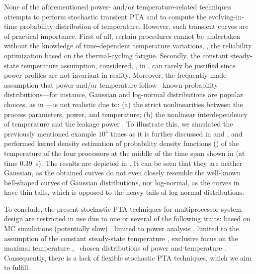
None of the aforementioned power- and/or temperature-related techniques attempts to perform stochastic transient PTA and to compute the evolving-in-time probability distribution of temperature.
However, such transient curves are of practical importance.
First of all, certain procedures cannot be undertaken without the knowledge of time-dependent temperature variations, \eg, the reliability optimization based on the thermal-cycling fatigue. Secondly, the constant steady-state temperature assumption, considered, \eg, in \cite{juan2011, juan2012}, can rarely be justified since power profiles are not invariant in reality.
Moreover, the frequently made assumption that power and/or temperature follow \apriori\ known probability distributions---for instance, Gaussian and log-normal distributions are popular choices, as in \cite{srivastava2010, juan2012, bhardwaj2006}---is not realistic due to: (a) the strict nonlinearities between the process parameters, power, and temperature; (b) the nonlinear interdependency of temperature and the leakage power \cite{liu2007}.
To illustrate this, we simulated the previously mentioned example $10^4$ times as it is further discussed in  and , and performed kernel density estimation of probability density functions (\pdfs) of the temperature of the four processors at the middle of the time span shown in  (at time 0.39~s).
The results are depicted in . It can be seen that they are neither Gaussian, as the obtained curves do not even closely resemble the well-known bell-shaped curves of Gaussian distributions, nor log-normal, as the curves in  have thin tails, which is opposed to the heavy tails of log-normal distributions.

To conclude, the present stochastic PTA techniques for multiprocessor system design are restricted in use due to one or several of the following traits: based on MC simulations (potentially slow) \cite{chandra2010}, limited to power analysis \cite{chandra2010, shen2009, bhardwaj2006, ghanta2006}, limited to the assumption of the constant steady-state temperature \cite{juan2011, juan2012}, exclusive focus on the maximal temperature \cite{juan2011}, \apriori\ chosen distributions of power and temperature \cite{srivastava2010, juan2012, bhardwaj2006}.
Consequently, there is a lack of flexible stochastic PTA techniques, which we aim to fulfill.
